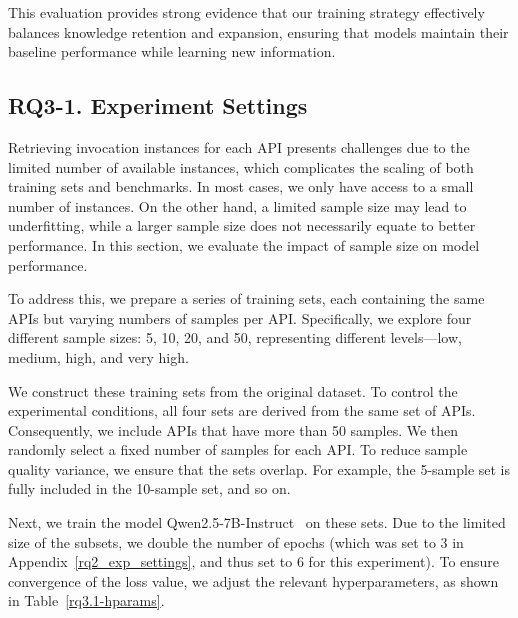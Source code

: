 This evaluation provides strong evidence that our training strategy effectively balances knowledge retention and expansion, ensuring that models maintain their baseline performance while learning new information.

\subsection{RQ3-1. Experiment Settings}
\label{rq3.1_exp_settings}
Retrieving invocation instances for each API presents challenges due to the limited number of available instances, which complicates the scaling of both training sets and benchmarks. In most cases, we only have access to a small number of instances. On the other hand, a limited sample size may lead to underfitting, while a larger sample size does not necessarily equate to better performance. In this section, we evaluate the impact of sample size on model performance. 

To address this, we prepare a series of training sets, each containing the same APIs but varying numbers of samples per API. Specifically, we explore four different sample sizes: 5, 10, 20, and 50, representing different levels—low, medium, high, and very high.

We construct these training sets from the original dataset. To control the experimental conditions, all four sets are derived from the same set of APIs. Consequently, we include APIs that have more than 50 samples. We then randomly select a fixed number of samples for each API. To reduce sample quality variance, we ensure that the sets overlap. For example, the 5-sample set is fully included in the 10-sample set, and so on.

Next, we train the model Qwen2.5-7B-Instruct~\cite{qwen2.5} on these sets. Due to the limited size of the subsets, we double the number of epochs (which was set to 3 in Appendix~\ref{rq2_exp_settings}, and thus set to 6 for this experiment). To ensure convergence of the loss value, we adjust the relevant hyperparameters, as shown in Table~\ref{rq3.1-hparams}.

